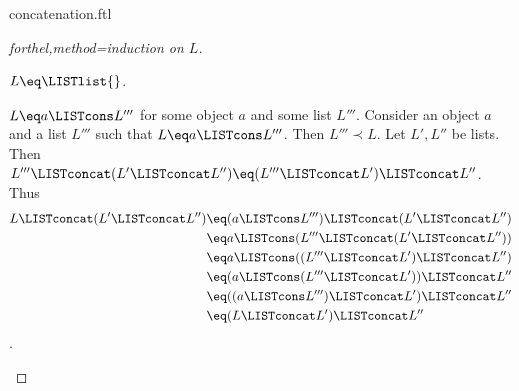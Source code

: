 \documentclass[lang=en,debug=all]{stex}
\begin{document}
\begin{smodule}{concatenation.ftl}
\begin{proof}[forthel,method=induction on $L$]
  \begin{case}{$L \eq \LISTlist{}$.} \end{case}

  \begin{case}{$L \eq a \LISTcons L'''$ for some object $a$ and some list $L'''$.}
    Consider an object $a$ and a list $L'''$ such that $L \eq a \LISTcons L'''$.
    Then $L''' \prec L$.
    Let $L',L''$ be lists.
    Then $L''' \LISTconcat (L' \LISTconcat L'') \eq (L''' \LISTconcat L') \LISTconcat L''$.
    Thus
    \begin{align*}
      L \LISTconcat (L' \LISTconcat L'') 
        &\eq (a \LISTcons L''') \LISTconcat (L' \LISTconcat L'')\\
        &\eq a \LISTcons (L''' \LISTconcat (L' \LISTconcat L''))\\
        &\eq a \LISTcons ((L''' \LISTconcat L') \LISTconcat L'')\\
        &\eq (a \LISTcons (L''' \LISTconcat L')) \LISTconcat L''\\
        &\eq ((a \LISTcons L''') \LISTconcat L') \LISTconcat L''\\
        &\eq (L \LISTconcat L') \LISTconcat L''
    \end{align*}.
  \end{case}
\end{proof}
\end{smodule}
\end{document}
